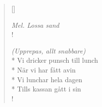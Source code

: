 
\settowidth{\versewidth}{Vi dricker punsch till lunch}



\begin{verse}[\versewidth]

\flagverse{}
\emph{Mel. Lossa sand}\\!


\emph{(Upprepas, allt snabbare)}\\*
Vi dricker punsch till lunch\\*
När vi har fått avin\\*
Vi lunchar hela dagen\\*
Tills kassan gått i sin\\!


\end{verse}

